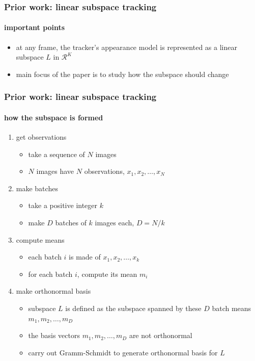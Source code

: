 \begin{frame}
\frametitle{Prior work: linear subspace tracking}
\framesubtitle{important points}
\logoCSIPCPL\mypagenum
	\begin{itemize}
		\item at any frame, the tracker's appearance model is represented as a linear subspace  $L$ in $\mathcal{R}^K$
		\item main focus of the paper is to study how the subspace should change
	\end{itemize}
\end{frame}



\begin{frame}
\frametitle{Prior work: linear subspace tracking}
\framesubtitle{how the subspace is formed}
\logoCSIPCPL\mypagenum
	\begin{enumerate}
		\item {\color{blue} get observations}
			\begin{itemize}
				\item take a sequence of $N$ images
				\item $N$ images have $N$ observations, $x_1, x_2, \ldots, x_N$
			\end{itemize}
		\item {\color{blue} make batches} 
			\begin{itemize}
				\item take a positive integer $k$
				\item make $D$ batches of $k$ images each, $D=N/k$
			\end{itemize}
		\item {\color{blue} compute means}
			\begin{itemize}
				\item each batch $i$ is made of $x_1, x_2, \ldots, x_k$
				\item for each batch $i$, compute its mean $m_i$
			\end{itemize}
		\item {\color{blue} make orthonormal basis} 
			\begin{itemize}
				\item subspace $L$ is defined as the subspace spanned by these $D$ batch means $m_1, m_2, \ldots, m_D$
				\item the basis vectors $m_1, m_2, \ldots, m_D$ are not orthonormal
				\item carry out Gramm-Schmidt to generate orthonormal basis for $L$
			\end{itemize}
	\end{enumerate}
\end{frame}




